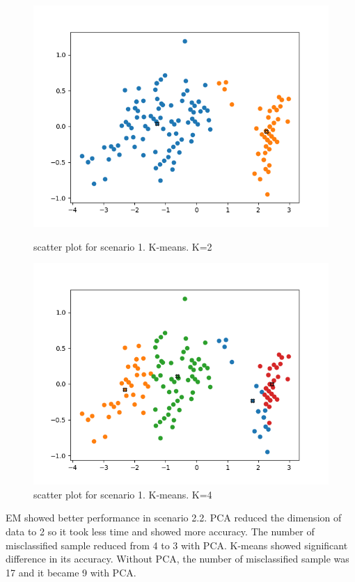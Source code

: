 \documentclass[a4paper]{article}
\begin{document}
\begin{figure}[h!]
\begin{minipage}[t]{6.5cm}
              \includegraphics[width=1.0\textwidth]{pca_k_s1_2.png}
              \caption{scatter plot for scenario 1. K-means. K=2}
            \end{minipage}
            \hspace{2cm}
            \begin{minipage}[t]{6.5cm}
              \includegraphics[width=1.0\textwidth]{pca_k_s1_4.png}
              \caption{scatter plot for scenario 1. K-means. K=4}
            \end{minipage}
          \end{figure}

        EM showed better performance in scenario 2.2. PCA reduced the dimension of data
        to 2 so it took less time and showed more accuracy. The number of misclassified sample
        reduced from 4 to 3 with PCA. K-means showed significant difference in its accuracy.
        Without PCA, the number of misclassified sample was 17 and it became 9 with PCA.
\end{document}
